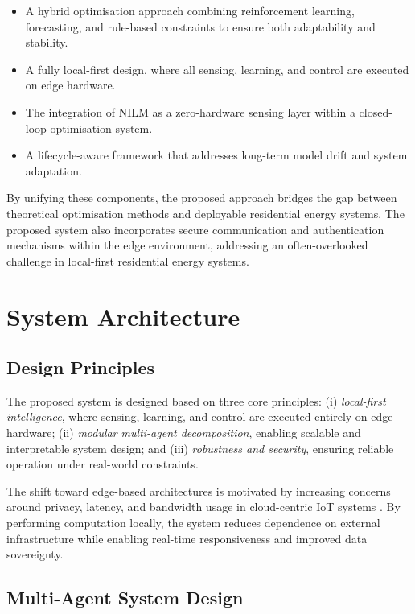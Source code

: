 \documentclass[11pt,a4paper]{article}
\begin{document}
\begin{itemize}
    \item A hybrid optimisation approach combining reinforcement learning, forecasting, and rule-based constraints to ensure both adaptability and stability.
    \item A fully local-first design, where all sensing, learning, and control are executed on edge hardware.
    \item The integration of NILM as a zero-hardware sensing layer within a closed-loop optimisation system.
    \item A lifecycle-aware framework that addresses long-term model drift and system adaptation.
\end{itemize}

By unifying these components, the proposed approach bridges the gap between theoretical optimisation methods and deployable residential energy systems. The proposed system also incorporates secure communication and authentication mechanisms within the edge environment, addressing an often-overlooked challenge in local-first residential energy systems.

\section{System Architecture}

\subsection{Design Principles}

The proposed system is designed based on three core principles: (i) \textit{local-first intelligence}, where sensing, learning, and control are executed entirely on edge hardware; (ii) \textit{modular multi-agent decomposition}, enabling scalable and interpretable system design; and (iii) \textit{robustness and security}, ensuring reliable operation under real-world constraints.

The shift toward edge-based architectures is motivated by increasing concerns around privacy, latency, and bandwidth usage in cloud-centric IoT systems \cite{zhou2019edge, lin2017survey}. By performing computation locally, the system reduces dependence on external infrastructure while enabling real-time responsiveness and improved data sovereignty.

\subsection{Multi-Agent System Design}
\end{document}
